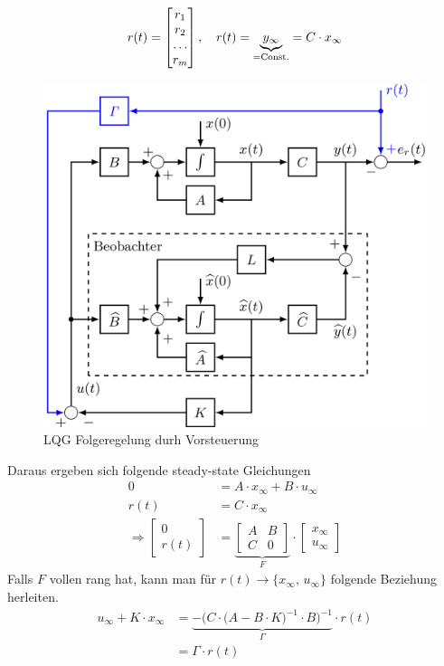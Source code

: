         \begin{equation*}
            r(t) = \begin{bmatrix}r_1\\r_2\\\hdots\\r_m\end{bmatrix},\quad
            r(t) = \underbrace{y_\infty}_{= \textnormal{Const.}} = C\cdot x_\infty
        \end{equation*}
        \begin{figure}[H]
            \centering
            \includegraphics[width = 0.6\linewidth]{images/10/LQG_Folg_Vorst.jpeg}
            \caption{LQG Folgeregelung durh Vorsteuerung}
        \end{figure}
        Daraus ergeben sich folgende steady-state Gleichungen
        \begin{align*}
            0 &= A\cdot x_\infty + B\cdot u_\infty\\
            r(t) &= C\cdot x_\infty\\
            \Rightarrow \begin{bmatrix}0\\r(t)\end{bmatrix} &= 
            \underbrace{\begin{bmatrix}
            A & B\\
            C & 0
            \end{bmatrix}}_{F} \cdot
            \begin{bmatrix}x_\infty\\u_\infty\end{bmatrix}
        \end{align*}
        Falls $F$ vollen rang hat, kann man für $r(t)\rightarrow\{x_\infty,\, u_\infty\}$ folgende Beziehung herleiten.
        \begin{align*}
            u_\infty + K\cdot x_\infty &= \underbrace{-\Big(C\cdot\big(A-B\cdot K\big)^{-1}\cdot B\Big)^{-1}}_{\mathit{\Gamma}} \cdot r(t)\\
            &= \mathit{\Gamma}\cdot r(t)
        \end{align*}